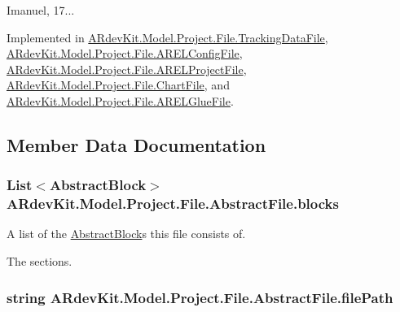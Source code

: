 Imanuel, 17... 

Implemented in \hyperlink{class_a_rdev_kit_1_1_model_1_1_project_1_1_file_1_1_tracking_data_file_a101d61e5cb5e45922adb70178838c5be}{A\-Rdev\-Kit.\-Model.\-Project.\-File.\-Tracking\-Data\-File}, \hyperlink{class_a_rdev_kit_1_1_model_1_1_project_1_1_file_1_1_a_r_e_l_config_file_a65bf5e667cb70e7cb9ae9a735ebba97f}{A\-Rdev\-Kit.\-Model.\-Project.\-File.\-A\-R\-E\-L\-Config\-File}, \hyperlink{class_a_rdev_kit_1_1_model_1_1_project_1_1_file_1_1_a_r_e_l_project_file_a021507cbd83b07773ffc1caf0645ca49}{A\-Rdev\-Kit.\-Model.\-Project.\-File.\-A\-R\-E\-L\-Project\-File}, \hyperlink{class_a_rdev_kit_1_1_model_1_1_project_1_1_file_1_1_chart_file_aa19af3145e3bbcb28683e7c77571d06f}{A\-Rdev\-Kit.\-Model.\-Project.\-File.\-Chart\-File}, and \hyperlink{class_a_rdev_kit_1_1_model_1_1_project_1_1_file_1_1_a_r_e_l_glue_file_af2a513e4dce9fe965fca00612335de10}{A\-Rdev\-Kit.\-Model.\-Project.\-File.\-A\-R\-E\-L\-Glue\-File}.



\subsection{Member Data Documentation}
\hypertarget{class_a_rdev_kit_1_1_model_1_1_project_1_1_file_1_1_abstract_file_a21e0333fb9d8eab8ebb039bd56ccabc9}{
\subsubsection[{blocks}]{\setlength{\rightskip}{0pt plus 5cm}List$<${\bf Abstract\-Block}$>$ A\-Rdev\-Kit.\-Model.\-Project.\-File.\-Abstract\-File.\-blocks\hspace{0.3cm}{\ttfamily [protected]}}}\label{class_a_rdev_kit_1_1_model_1_1_project_1_1_file_1_1_abstract_file_a21e0333fb9d8eab8ebb039bd56ccabc9}


A list of the \hyperlink{class_a_rdev_kit_1_1_model_1_1_project_1_1_file_1_1_abstract_block}{Abstract\-Block}s this file consists of. 

The sections. \hypertarget{class_a_rdev_kit_1_1_model_1_1_project_1_1_file_1_1_abstract_file_ad879e3a81860da8b72f2d9f61a18ab3b}{
\subsubsection[{file\-Path}]{\setlength{\rightskip}{0pt plus 5cm}string A\-Rdev\-Kit.\-Model.\-Project.\-File.\-Abstract\-File.\-file\-Path\hspace{0.3cm}{\ttfamily [protected]}}}\label{class_a_rdev_kit_1_1_model_1_1_project_1_1_file_1_1_abstract_file_ad879e3a81860da8b72f2d9f61a18ab3b}


